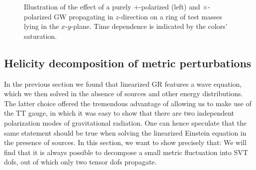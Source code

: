 \begin{figure}[t]
{
	}
	\caption{Illustration of the effect of a purely $+$-polarized (left) and $\times$-polarized \ac{GW} propagating in $z$-direction on a ring of test masses lying in the $x$-$y$-plane. Time dependence is indicated by the colors' saturation.}
	\label{fig:testmassesGW}
\end{figure}


\subsection{Helicity decomposition of metric perturbations} \label{sec:SVT}

In the previous section we found that linearized \ac{GR} features a wave equation, which we then solved in the absence of sources and other energy distributions. The latter choice offered the tremendous advantage of allowing us to make use of the \ac{TT} gauge, in which it was easy to show that there are two independent polarization modes of gravitational radiation.  One can hence speculate that the same statement should be true when solving the linearized Einstein equation in the presence of sources. In this section, we want to show precisely that: We will find that it is always possible to decompose a small metric fluctuation into \ac{SVT} \acp{dof}, out of which only two tensor \acp{dof} propagate.

